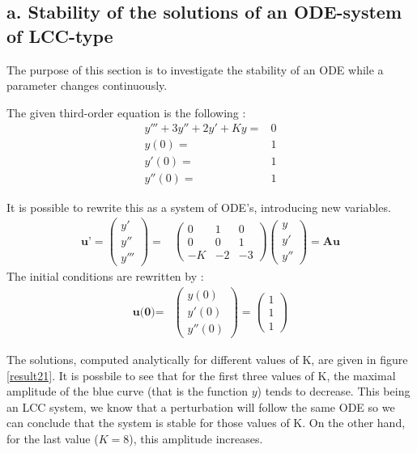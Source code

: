 \subsection*{a. Stability of the solutions of an ODE-system of LCC-type}
The purpose of this section is to investigate the stability of an ODE while a parameter changes continuously.

The given third-order equation is the following : 
\begin{eqnarray*}
y'''+3y''+2y'+Ky =& 0 \\
y(0) =& 1\\
y'(0)=&1\\
y''(0)=&1
\end{eqnarray*}

It is possible to rewrite this as a system of ODE's, introducing new variables.
\begin{eqnarray*}
\textbf{u'}  = \left( \begin{array}{c}
y' \\ 
y'' \\ 
y'''
\end{array} \right) =& \left( \begin{array}{ccc}
0 & 1 & 0 \\ 
0 & 0 & 1 \\ 
-K & -2 & -3
\end{array}  \right) \left( \begin{array}{c}
y \\ 
y'\\ 
y''
\end{array} \right) = \textbf{Au} 
\end{eqnarray*}
The initial conditions are rewritten by :
\begin{eqnarray*}
\textbf{u(0)} =& \left( \begin{array}{c}
y(0) \\ 
y'(0)\\ 
y''(0)
\end{array} \right) = \left( \begin{array}{c}
1\\ 
1\\ 
1
\end{array} \right) 
\end{eqnarray*}

The solutions, computed analytically for different values of K, are given in figure \ref{result21}. It is possbile to see that for the first three values of K, the maximal amplitude of the blue curve (that is the function $y$) tends to decrease. This being an LCC system, we know that a perturbation will follow the same ODE so we can conclude that the system is stable for those values of K. On the other hand, for the last value ($K=8$), this amplitude increases.

